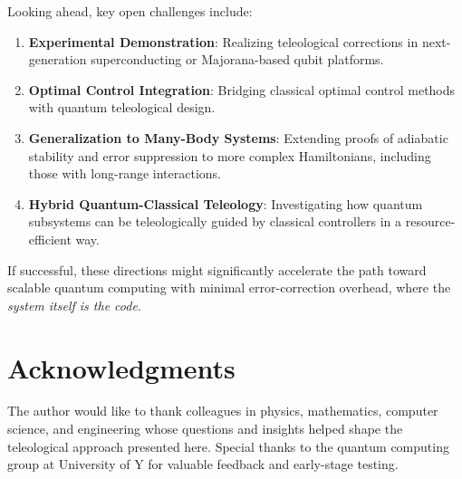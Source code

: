 \documentclass[11pt]{article}
\begin{document}
Looking ahead, key open challenges include:
\begin{enumerate}
\item \textbf{Experimental Demonstration}: Realizing teleological corrections in next-generation superconducting or Majorana-based qubit platforms.
\item \textbf{Optimal Control Integration}: Bridging classical optimal control methods with quantum teleological design.
\item \textbf{Generalization to Many-Body Systems}: Extending proofs of adiabatic stability and error suppression to more complex Hamiltonians, including those with long-range interactions.
\item \textbf{Hybrid Quantum-Classical Teleology}: Investigating how quantum subsystems can be teleologically guided by classical controllers in a resource-efficient way.
\end{enumerate}

If successful, these directions might significantly accelerate the path toward scalable quantum computing with minimal error-correction overhead, where the \emph{system itself is the code}.

\section*{Acknowledgments}
The author would like to thank colleagues in physics, mathematics, computer science, and engineering whose questions and insights helped shape the teleological approach presented here. Special thanks to the quantum computing group at University of Y for valuable feedback and early-stage testing.
\end{document}
